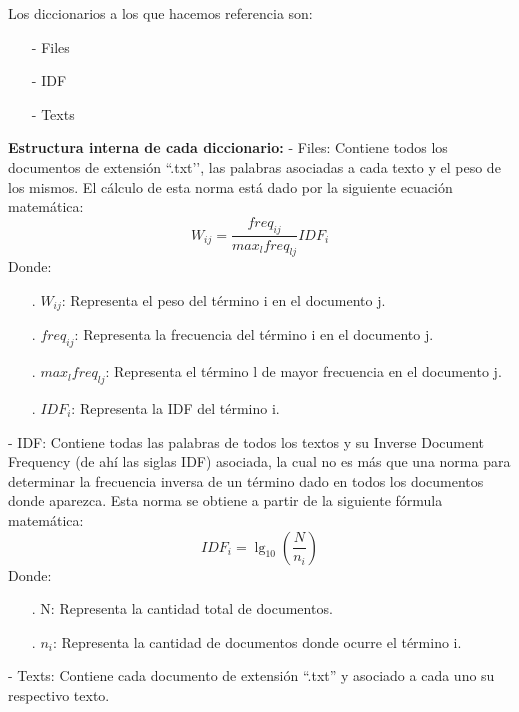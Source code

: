 \documentclass{article}
\begin{document}
Los diccionarios a los que hacemos referencia son:
\begin{itemize}
	\item[-] Files
	\item[-] IDF
	\item[-] Texts
\end{itemize}
\textbf{Estructura interna de cada diccionario:}
\newline
\newline
- Files: Contiene todos los documentos de extensión “.txt’’, las palabras asociadas a cada
texto y el peso de los mismos. El cálculo de esta norma está dado por la siguiente ecuación
matemática:
\newline
\newline
$$
	W_{ij}=\frac{freq_{ij}}{max_{l}freq_{lj}} IDF_{i}
$$
\newline
\newline
Donde:
\begin{itemize}
	\item[.]$W_{ij}$: Representa el peso del término i en el documento j.
	\item[.]$freq_{ij}$: Representa la frecuencia del término i en el documento j.
	\item[.]$max_{l}freq_{lj}$: Representa el término l de mayor frecuencia en el documento j.
	\item[.]$IDF_{i}$: Representa la IDF del término i.
\end{itemize}

- IDF: Contiene todas las palabras de todos los textos y su Inverse Document Frequency (de ahí las siglas IDF)
asociada, la cual no es más que una norma para determinar la frecuencia inversa de un término
dado en todos los documentos donde aparezca. Esta norma se obtiene a partir de la
siguiente fórmula matemática:
\newline
$$
	IDF_{i}=\lg_{10}{(\frac{N}{n_{i}})}
$$
\newline
Donde:
\begin{itemize}
	\item [.]N: Representa la cantidad total de documentos.
	\item [.]$n_{i}$: Representa la cantidad de documentos donde ocurre el término i.
\end{itemize}

- Texts: Contiene cada documento de extensión “.txt” y asociado a cada uno su respectivo texto.
\end{document}
